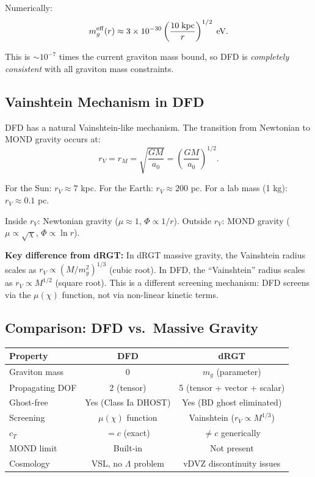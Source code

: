 \documentclass[11pt,a4paper]{article}
\begin{document}
Numerically:
\begin{equation}
m_g^{\rm eff}(r) \approx 3 \times 10^{-30}\left(\frac{10\;\text{kpc}}{r}\right)^{1/2}\;\text{eV}.
\end{equation}

This is $\sim 10^{-7}$ times the current graviton mass bound, so DFD is \emph{completely consistent} with all graviton mass constraints.

\subsection{Vainshtein Mechanism in DFD}

DFD has a natural Vainshtein-like mechanism. The transition from Newtonian to MOND gravity occurs at:
\begin{equation}
r_V = r_M = \sqrt{\frac{GM}{a_0}} = \left(\frac{GM}{a_0}\right)^{1/2}.
\end{equation}

For the Sun: $r_V \approx 7$ kpc.
For the Earth: $r_V \approx 200$ pc.
For a lab mass (1 kg): $r_V \approx 0.1$ pc.

Inside $r_V$: Newtonian gravity ($\mu \approx 1$, $\Phi \propto 1/r$).
Outside $r_V$: MOND gravity ($\mu \propto \sqrt{\chi}$, $\Phi \propto \ln r$).

\textbf{Key difference from dRGT:} In dRGT massive gravity, the Vainshtein radius scales as $r_V \propto (M/m_g^2)^{1/3}$ (cubic root). In DFD, the ``Vainshtein'' radius scales as $r_V \propto M^{1/2}$ (square root). This is a different screening mechanism: DFD screens via the $\mu(\chi)$ function, not via non-linear kinetic terms.

\subsection{Comparison: DFD vs.\ Massive Gravity}

\begin{center}
\begin{tabular}{lcc}
\toprule
\textbf{Property} & \textbf{DFD} & \textbf{dRGT} \\
\midrule
Graviton mass & 0 & $m_g$ (parameter) \\
Propagating DOF & 2 (tensor) & 5 (tensor + vector + scalar) \\
Ghost-free & Yes (Class Ia DHOST) & Yes (BD ghost eliminated) \\
Screening & $\mu(\chi)$ function & Vainshtein ($r_V \propto M^{1/3}$) \\
$c_T$ & $= c$ (exact) & $\neq c$ generically \\
MOND limit & Built-in & Not present \\
Cosmology & VSL, no $\Lambda$ problem & vDVZ discontinuity issues \\
\bottomrule
\end{tabular}
\end{center}
\end{document}
